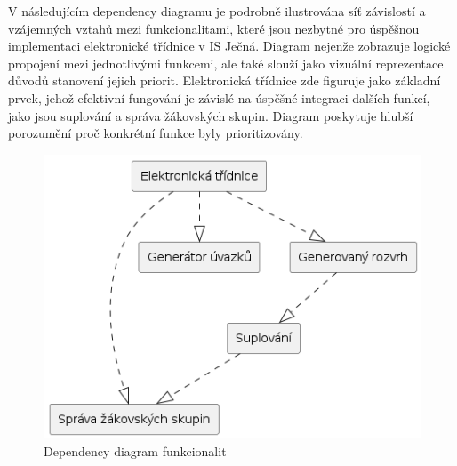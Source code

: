 \documentclass[FM,Proj]{tulthesis}
\begin{document}
V následujícím dependency diagramu je podrobně ilustrována síť závislostí
a vzájemných vztahů mezi funkcionalitami, které jsou nezbytné pro úspěšnou
implementaci elektronické třídnice v IS Ječná. Diagram nejenže zobrazuje 
logické propojení mezi jednotlivými funkcemi, ale také slouží jako vizuální 
reprezentace důvodů stanovení jejich priorit. Elektronická třídnice zde 
figuruje jako základní prvek, jehož efektivní fungování je závislé na 
úspěšné integraci dalších funkcí, jako jsou suplování a správa žákovských skupin. 
Diagram poskytuje hlubší porozumění proč konkrétní funkce byly prioritizovány.

\begin{figure}[H]
    \includegraphics[width=\textwidth-28pt]{dep-eltridnice.png}
    \caption{Dependency diagram funkcionalit}
    \label{fig:dep-eltridnice}
\end{figure}
\end{document}
